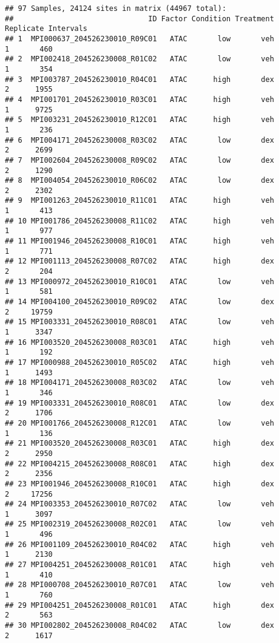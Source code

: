 \documentclass[
]{article}
\begin{document}
\begin{verbatim}
## 97 Samples, 24124 sites in matrix (44967 total):
##                               ID Factor Condition Treatment Replicate Intervals
## 1  MPI000637_204526230010_R09C01   ATAC       low       veh         1       460
## 2  MPI002418_204526230008_R01C02   ATAC       low       veh         1       354
## 3  MPI003787_204526230010_R04C01   ATAC      high       dex         2      1955
## 4  MPI001701_204526230010_R03C01   ATAC      high       veh         1      9725
## 5  MPI003231_204526230010_R12C01   ATAC      high       veh         1       236
## 6  MPI004171_204526230008_R03C02   ATAC       low       dex         2      2699
## 7  MPI002604_204526230008_R09C02   ATAC       low       dex         2      1290
## 8  MPI004054_204526230010_R06C02   ATAC       low       dex         2      2302
## 9  MPI001263_204526230010_R11C01   ATAC      high       veh         1       413
## 10 MPI001786_204526230008_R11C02   ATAC      high       veh         1       977
## 11 MPI001946_204526230008_R10C01   ATAC      high       veh         1       771
## 12 MPI001113_204526230008_R07C02   ATAC      high       dex         2       204
## 13 MPI000972_204526230010_R10C01   ATAC       low       veh         1       581
## 14 MPI004100_204526230010_R09C02   ATAC       low       dex         2     19759
## 15 MPI003331_204526230010_R08C01   ATAC       low       veh         1      3347
## 16 MPI003520_204526230008_R03C01   ATAC      high       veh         1       192
## 17 MPI000988_204526230010_R05C02   ATAC      high       veh         1      1493
## 18 MPI004171_204526230008_R03C02   ATAC       low       veh         1       346
## 19 MPI003331_204526230010_R08C01   ATAC       low       dex         2      1706
## 20 MPI001766_204526230008_R12C01   ATAC       low       veh         1       136
## 21 MPI003520_204526230008_R03C01   ATAC      high       dex         2      2950
## 22 MPI004215_204526230008_R08C01   ATAC      high       dex         2      2356
## 23 MPI001946_204526230008_R10C01   ATAC      high       dex         2     17256
## 24 MPI003353_204526230010_R07C02   ATAC       low       veh         1      3097
## 25 MPI002319_204526230008_R02C01   ATAC       low       veh         1       496
## 26 MPI001109_204526230010_R04C02   ATAC      high       veh         1      2130
## 27 MPI004251_204526230008_R01C01   ATAC      high       veh         1       410
## 28 MPI000708_204526230010_R07C01   ATAC       low       veh         1       760
## 29 MPI004251_204526230008_R01C01   ATAC      high       dex         2       563
## 30 MPI002802_204526230008_R04C02   ATAC       low       dex         2      1617

\end{verbatim}
\end{document}
